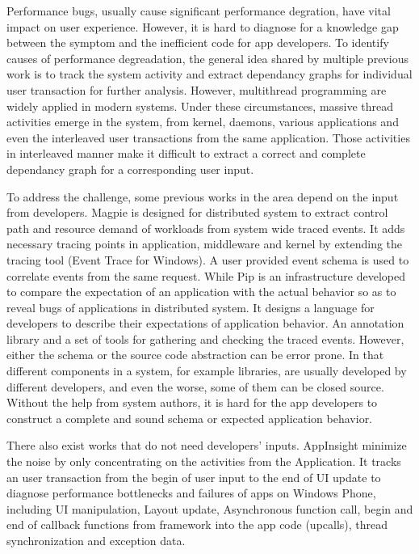 Performance bugs, usually cause significant performance degration, have vital impact on user experience.
However, it is hard to diagnose for a knowledge gap between the symptom and the inefficient code for app developers.
To identify causes of performance degreadation, the general idea shared by multiple previous work is to track the system activity and extract dependancy graphs for individual user transaction for further analysis.
However, multithread programming are widely applied in modern systems.
Under these circumstances, massive thread activities emerge in the system, from kernel, daemons, various applications and even the interleaved user transactions from the same application.
Those activities in interleaved manner make it difficult to extract a correct and complete dependancy graph for a corresponding user input.
\par
To address the challenge, some previous works in the area depend on the input from developers.
Magpie is designed for distributed system to extract control path and resource demand of workloads from system wide traced events.
It adds necessary tracing points in application, middleware and kernel by extending the tracing tool (Event Trace for Windows).
A user provided event schema is used to correlate events from the same request.
While Pip is an infrastructure developed to compare the expectation of an application with the actual behavior so as to reveal bugs of applications in distributed system.
It designs a language for developers to describe their expectations of application behavior.
An annotation library and a set of tools for gathering and checking the traced events.
However, either the schema or the source code abstraction can be error prone.
In that different components in a system, for example libraries, are usually developed by different developers,
and even the worse, some of them can be closed source.
Without the help from system authors, it is hard for the app developers to construct a complete and sound schema or expected application behavior.
\par
There also exist works that do not need developers' inputs.
AppInsight minimize the noise by only concentrating on the activities from the Application.
It tracks an user transaction from the begin of user input to the end of UI update to diagnose performance bottlenecks and failures of apps on Windows Phone, including UI manipulation, Layout update, Asynchronous function call, begin and end of callback functions from framework into the app code (upcalls), thread synchronization and exception data.
